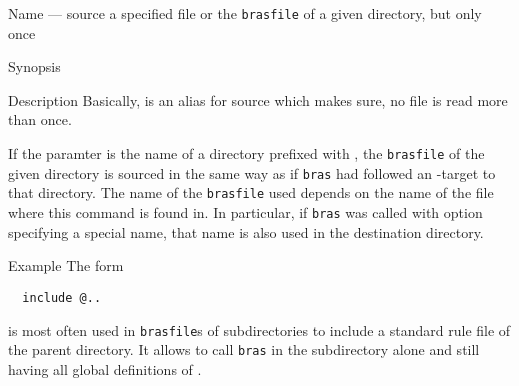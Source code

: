 \documentclass[11pt]{scrartcl}
\newcommand{\bras}{\texttt{bras}}
\newcommand{\brasfile}{\texttt{brasfile}}
\begin{document}
\label{proc:include}
\begin{Describe}
\item[Name]  --- source a specified file or the
  \brasfile{} of a given directory, but only once
\item[Synopsis]  \\
   
\item[Description] Basically,  is an alias for source
  which makes sure, no file is read more than once. 
  
  If the paramter is the name of a directory prefixed with , the
  \brasfile{} of the given directory is sourced in the same way as if
  \bras{} had followed an -target to that directory. The name of
  the \brasfile{} used depends on the name of the file where this
  command is found in. In particular, if \bras{} was called with
  option  specifying a special name, that name is also used in
  the destination directory.
\item[Example]
  The form
  \begin{verbatim}
  include @..
  \end{verbatim}
  is most often used in \brasfile{}s of subdirectories to include a
  standard rule file of the parent directory. It allows to call
  \bras{} in the subdirectory alone and still having all global
  definitions of .
\end{Describe}
\end{document}
